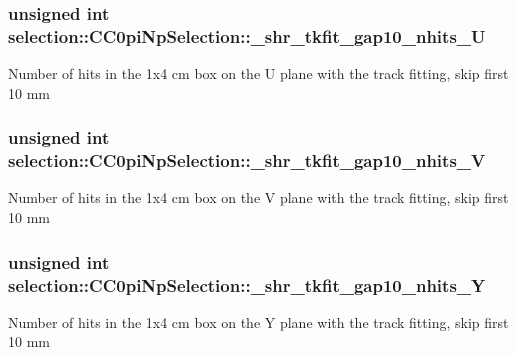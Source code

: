 \subsubsection[{\texorpdfstring{\+\_\+shr\+\_\+tkfit\+\_\+gap10\+\_\+nhits\+\_\+U}{_shr_tkfit_gap10_nhits_U}}]{\setlength{\rightskip}{0pt plus 5cm}unsigned int selection\+::\+C\+C0pi\+Np\+Selection\+::\+\_\+shr\+\_\+tkfit\+\_\+gap10\+\_\+nhits\+\_\+U\hspace{0.3cm}{\ttfamily [private]}}\hypertarget{classselection_1_1CC0piNpSelection_ae639e53ae1ea9c2bed506ca5d2e5c486}{}\label{classselection_1_1CC0piNpSelection_ae639e53ae1ea9c2bed506ca5d2e5c486}
Number of hits in the 1x4 cm box on the U plane with the track fitting, skip first 10 mm 
\subsubsection[{\texorpdfstring{\+\_\+shr\+\_\+tkfit\+\_\+gap10\+\_\+nhits\+\_\+V}{_shr_tkfit_gap10_nhits_V}}]{\setlength{\rightskip}{0pt plus 5cm}unsigned int selection\+::\+C\+C0pi\+Np\+Selection\+::\+\_\+shr\+\_\+tkfit\+\_\+gap10\+\_\+nhits\+\_\+V\hspace{0.3cm}{\ttfamily [private]}}\hypertarget{classselection_1_1CC0piNpSelection_a1dac5397a17c360ce67831fa3ed8aed5}{}\label{classselection_1_1CC0piNpSelection_a1dac5397a17c360ce67831fa3ed8aed5}
Number of hits in the 1x4 cm box on the V plane with the track fitting, skip first 10 mm 
\subsubsection[{\texorpdfstring{\+\_\+shr\+\_\+tkfit\+\_\+gap10\+\_\+nhits\+\_\+Y}{_shr_tkfit_gap10_nhits_Y}}]{\setlength{\rightskip}{0pt plus 5cm}unsigned int selection\+::\+C\+C0pi\+Np\+Selection\+::\+\_\+shr\+\_\+tkfit\+\_\+gap10\+\_\+nhits\+\_\+Y\hspace{0.3cm}{\ttfamily [private]}}\hypertarget{classselection_1_1CC0piNpSelection_ac4f7286273aa34122aa80e6dbf34b9f7}{}\label{classselection_1_1CC0piNpSelection_ac4f7286273aa34122aa80e6dbf34b9f7}
Number of hits in the 1x4 cm box on the Y plane with the track fitting, skip first 10 mm 

